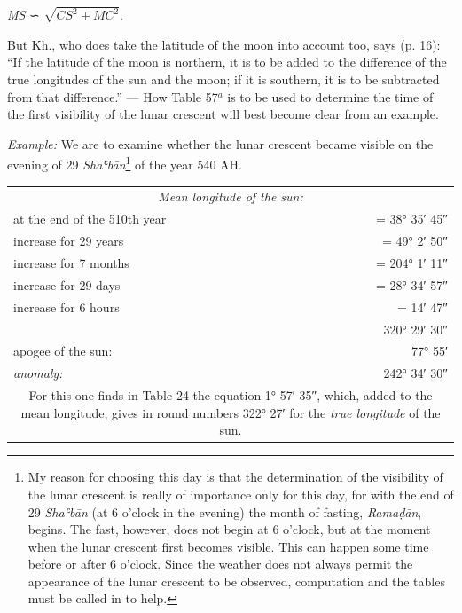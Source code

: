 \documentclass[11pt]{article}
\newcommand{\Pg}[1]{\marginpar{\footnotesize\color{gray}#1}}
\begin{document}
\par\begin{center}\emph{MS} {\SignFont\upshape ∽} $\sqrt{CS^{2}+MC^{2}}$.\end{center}
\par \Pg{67}But Kh., who does take the latitude of the moon into account too, says (p. 16): “If the latitude of the moon is northern, it is to be added to the difference of the true longitudes of the sun and the moon; if it is southern, it is to be subtracted from that difference.” — How Table 57$^{a}$ is to be used to determine the time of the first visibility of the lunar crescent will best become clear from an example.\par
\par \emph{Example:} We are to examine whether the lunar crescent became visible on the evening of 29 \emph{Shaʿbān}\footnote{My reason for choosing this day is that the determination of the visibility of the lunar crescent is really of importance only for this day, for with the end of 29 \emph{Shaʿbān} (at 6 o'clock in the evening) the month of fasting, \emph{Ramaḍān}, begins. The fast, however, does not begin at 6 o'clock, but at the moment when the lunar crescent first becomes visible. This can happen some time before or after 6 o'clock. Since the weather does not always permit the appearance of the lunar crescent to be observed, computation and the tables must be called in to help.} of the year 540 AH.\par
\begin{center}\small\begin{tabular}{lr}
\multicolumn{2}{c}{\emph{\emph{Mean longitude of the sun:}}} \\
at the end of the 510th year & = 38° 35′ 45″ \\
increase for 29 years & = 49° 2′ 50″ \\
increase for 7 months & = 204° 1′ 11″ \\
increase for 29 days\footnotemarkT{} & = 28° 34′ 57″ \\
increase for 6 hours & = 14′ 47″ \\
 & 320° 29′ 30″ \\
apogee of the sun: & 77° 55′ \\
\emph{anomaly:} & 242° 34′ 30″ \\
\multicolumn{2}{c}{For this one finds in Table 24 the equation 1° 57′ 35″, which, added to the mean longitude, gives in round numbers 322° 27′ for the \emph{true longitude} of the sun.} \\
\end{tabular}\end{center}
\end{document}
